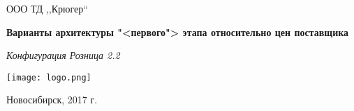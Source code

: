 \begin{titlepage}
\begin{center}
\large
ООО ТД ,,Крюгер``

%
\vspace{2.25cm}

	\textbf{Варианты архитектуры "<первого"> этапа относительно цен поставщика} 

\textit{Конфигурация Розница 2.2}
\vfill    

{\texttt{[image: logo.png]}}  

\end{center}
\vfill

\newlength{\ML}

\begin{center}
Новосибирск, 2017 г.
\end{center}
\end{titlepage}